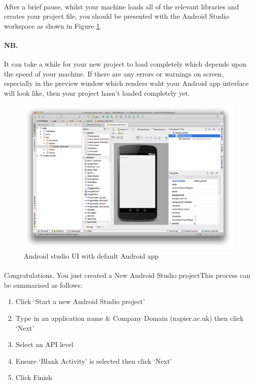 \paragraph{} After a brief pause, whilst your machine loads all of the relevant libraries and creates your project file, you should be presented with the Android Studio workspace as shown in Figure \ref{fig:android.studio_studioui}.

\paragraph{NB.} It can take a while for your new project to load completely which depends upon the speed of your machine. If there are any errors or warnings on screen, especially in the preview window which renders waht your Android app interface will look like, then your project hasn't loaded completely yet.

\begin{figure}[H]
\centering
\includegraphics[width=\textwidth]{images/android-studio_08_studio-ui}
\caption{Android studio UI with default Android app}
\label{fig:android.studio_studioui}
\end{figure}

\paragraph{} Congratulations. You just created a New Android Studio projectThis process can be summarised as follows:

\begin{enumerate}
\item Click `Start a new Android Studio project'
\item Type in an application name \& Company Domain (napier.ac.uk) then click `Next'
\item Select an API level
\item Ensure `Blank Activity' is selected then click `Next'
\item Click Finish
\end{enumerate}

